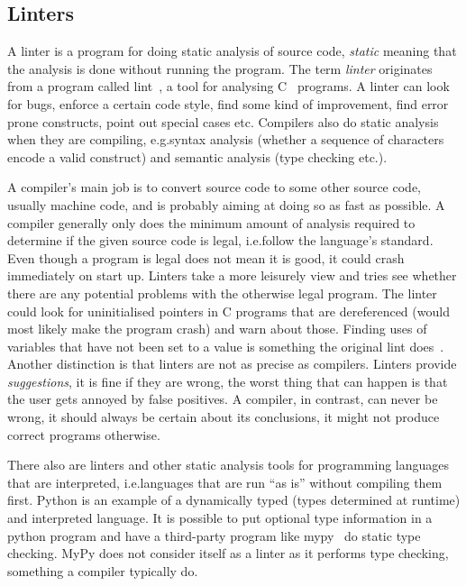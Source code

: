 \documentclass[a4paper,12pt]{article}
\begin{document}
\subsection{Linters}\label{sec:bkg:linter}

A linter is a program for doing static analysis of source code, \emph{static} meaning that
the analysis is done without running the program. The term \emph{linter} originates from a
program called lint~\cite{lint}, a tool for analysing C~\cite{c1978} programs. A linter can look for
bugs, enforce a certain code style, find some kind of improvement, find error prone
constructs, point out special cases etc. Compilers also do static analysis when they are
compiling, e.g.\@ syntax analysis (whether a sequence of characters encode a valid
construct) and semantic analysis (type checking etc.\@).

A compiler's main job is to convert source code to some other source code, usually machine
code, and is probably aiming at doing so as fast as possible. A compiler generally only
does the minimum amount of analysis required to determine if the given source code is
legal, i.e.\@ follow the language's standard. Even though a program is legal does not mean
it is good, it could crash immediately on start up. Linters take a more leisurely view and
tries see whether there are any potential problems with the otherwise legal program. The
linter could look for uninitialised pointers in C programs that are dereferenced (would most likely make
the program crash) and warn about those. Finding uses of variables that have not been set
to a value is something the original lint does~\cite{lint}. Another distinction is that
linters are not as precise as compilers. Linters provide \emph{suggestions}, it is fine if
they are wrong, the worst thing that can happen is that the user gets annoyed by false
positives. A compiler, in contrast, can never be wrong, it should always be certain about
its conclusions, it might not produce correct programs otherwise.

There also are linters and other static analysis tools for
programming languages that are
interpreted, i.e.\@ languages that are run ``as is'' without compiling them first. Python
is an example of a dynamically typed (types determined at runtime) and interpreted
language. It is possible to put optional type information in a python program and have a
third-party program like mypy~\cite{mypy} do static type checking. MyPy does not
consider itself as a linter as it performs type checking, something a compiler typically
do.
\end{document}
